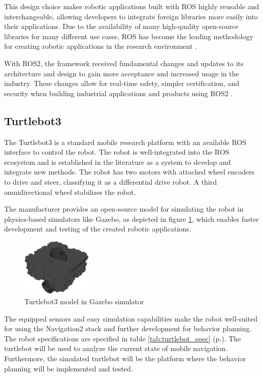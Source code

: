 This design choice makes robotic applications built with ROS highly reusable and interchangeable, allowing developers to integrate foreign libraries more easily into their applications. Due to the availability of many high-quality open-source libraries for many different use cases, ROS has become the leading methodology for creating robotic applications in the research environment \cite{quigley2009}. 

With ROS2, the framework received fundamental changes and updates to its architecture and design to gain more acceptance and increased usage in the industry. These changes allow for real-time safety, simpler certification, and security when building industrial applications and products using ROS2 \cite{ros2022}. 

\subsection{Turtlebot3}
\label{subsec:Turtlebot3}

The Turtlebot3 is a standard mobile research platform with an available ROS interface to control the robot. The robot is well-integrated into the ROS ecosystem and is established in the literature as a system to develop and integrate new methods. The robot has two motors with attached wheel encoders to drive and steer, classifying it as a differential drive robot. A third omnidirectional wheel stabilizes the robot. 

The manufacturer provides an open-source model for simulating the robot in physics-based simulators like Gazebo, as depicted in figure \ref{fig:turtlebot}, which enables faster development and testing of the created robotic applications.

\begin{figure}[ht]
	\centering
	\includegraphics[width=0.3\textwidth]{images/turtlebot_sim.png}
	\caption{Turtlebot3 model in Gazebo simulator}
	\label{fig:turtlebot}
\end{figure}

The equipped sensors and easy simulation capabilities make the robot well-suited for using the Navigation2 stack and further development for behavior planning. The robot specifications are specified in table \ref{tab:turtlebot_spec} (p.\pageref{tab:turtlebot_spec}). The turtlebot will be used to analyze the current state of mobile navigation. Furthermore, the simulated turtlebot will be the platform where the behavior planning will be implemented and tested.

